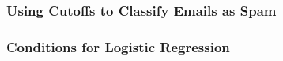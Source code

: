 \documentclass[slides]{beamer}
\newcommand{\blue}[1]{\textcolor{blue2}{#1}}
\begin{document}
\begin{frame}[fragile]
\frametitle{Using Cutoffs to Classify Emails as Spam}

%
%

\end{frame}


\begin{frame}[fragile]
\frametitle{Conditions for Logistic Regression}

%
%
%

\end{frame}
\end{document}
